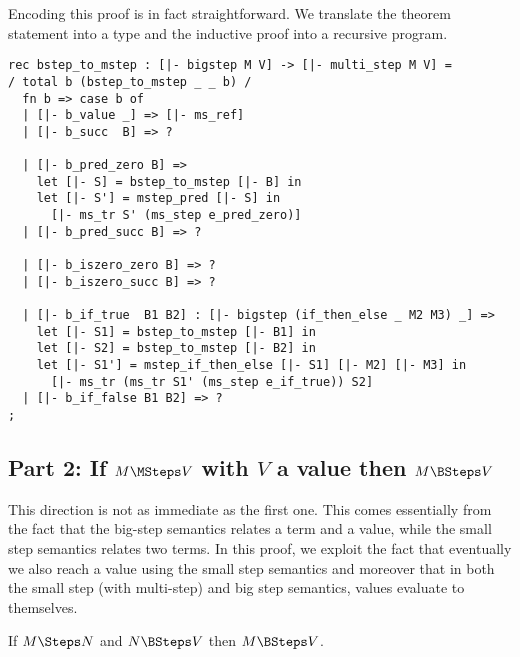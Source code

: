 Encoding this proof is in fact straightforward. We translate the
theorem statement into a type and the inductive proof into a recursive
program.


\begin{lstlisting}
rec bstep_to_mstep : [|- bigstep M V] -> [|- multi_step M V] =
/ total b (bstep_to_mstep _ _ b) /
  fn b => case b of
  | [|- b_value _] => [|- ms_ref]
  | [|- b_succ  B] => ?

  | [|- b_pred_zero B] =>
    let [|- S] = bstep_to_mstep [|- B] in
    let [|- S'] = mstep_pred [|- S] in
      [|- ms_tr S' (ms_step e_pred_zero)]
  | [|- b_pred_succ B] => ?

  | [|- b_iszero_zero B] => ?
  | [|- b_iszero_succ B] => ?

  | [|- b_if_true  B1 B2] : [|- bigstep (if_then_else _ M2 M3) _] =>
    let [|- S1] = bstep_to_mstep [|- B1] in
    let [|- S2] = bstep_to_mstep [|- B2] in
    let [|- S1'] = mstep_if_then_else [|- S1] [|- M2] [|- M3] in
      [|- ms_tr (ms_tr S1' (ms_step e_if_true)) S2]
  | [|- b_if_false B1 B2] => ?
;
  \end{lstlisting}



\subsection{Part 2: If $M \MSteps V$ with $V$ a value then $M \BSteps V$ }

This direction is not as immediate as the first one. This comes essentially from
the fact that the big-step semantics relates a term and a value, while the
small step semantics relates two terms. In this proof, we
exploit the fact that eventually we also reach a value using the
small step semantics and moreover that in both the small step (with multi-step)
and big step semantics, values evaluate to themselves.


\begin{lemma}\label{lem:step-bstep-to-bstep}
  If $M \Steps N$ and $N \BSteps V$ then $M \BSteps V$.
\end{lemma}


